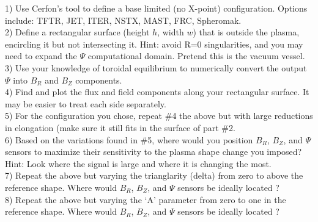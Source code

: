 \documentclass[letterpaper,12pt]{article}
\begin{document}
1) Use Cerfon's tool to define a base limited (no X-point) configuration. Options include: TFTR, JET, ITER, NSTX, MAST, FRC, Spheromak.\\

2) Define a rectangular surface (height $h$, width $w$) that is outside the plasma, encircling it but not intersecting it. Hint: avoid R=0 singularities, and you may need to expand the $\Psi$ computational domain. Pretend this is the vacuum vessel. \\

3) Use your knowledge of toroidal equilibrium to numerically convert the output $\Psi$ into $B_R$ and $B_Z$ components.\\

4) Find and plot the flux and field components along your rectangular surface. It may be easier to treat each side separately.\\

5) For the configuration you chose, repeat \#4 the above but with large reductions in elongation (make sure it still fits in the surface of part \#2.\\

6) Based on the variations found in \#5, where would you position $B_R$, $B_Z$, and $\Psi$ sensors to maximize their sensitivity to the plasma shape change you imposed? Hint: Look where the signal is large and where it is changing the most.\\

7) Repeat the above but varying the trianglarity (delta) from zero to above the reference shape. Where would $B_R$, $B_Z$, and $\Psi$ sensors be ideally located ?\\

8) Repeat the above but varying the `A' parameter from zero to one in the reference shape. Where would $B_R$, $B_Z$, and $\Psi$ sensors be ideally located ?
\end{document}

